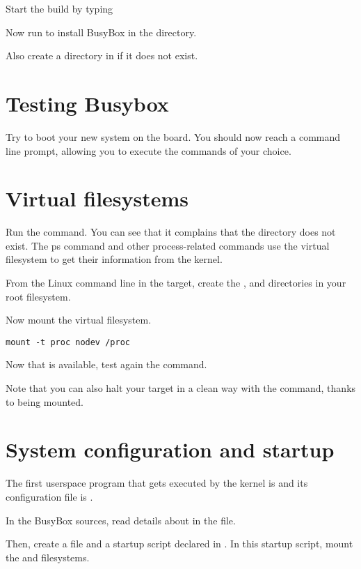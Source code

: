 Start the build by typing 

Now run  to install BusyBox in the  directory.

Also create a  directory in  if it does not exist.

\section{Testing Busybox}

Try to boot your new system on the board. You should now reach a 
command line prompt, allowing you to execute the commands of your
choice.

\section{Virtual filesystems}

Run the  command. You can see that it complains that the
 directory does not exist. The ps command and other
process-related commands use the  virtual filesystem to get
their information from the kernel.

From the Linux command line in the target, create the ,  and
 directories in your root filesystem.

Now mount the  virtual filesystem.

\begin{verbatim}
mount -t proc nodev /proc
\end{verbatim}

 Now that  is
available, test again the  command.

Note that you can also halt your target in a clean way with the 
command, thanks to  being mounted.

\section{System configuration and startup}

The first userspace program that gets executed by the kernel is
 and its configuration file is .

In the BusyBox sources, read details about  in the
 file.

Then, create a  file and a 
startup script declared in . In this startup
script, mount the  and  filesystems.

